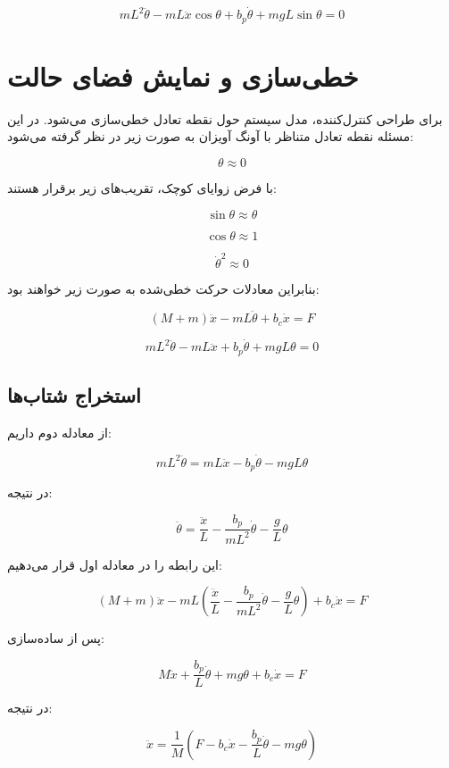\documentclass[a4paper,12pt]{article}
\begin{document}
\[
    mL^2\ddot{\theta}
    -
    mL\ddot{x}\cos\theta
    +
    b_p\dot{\theta}
    +
    mgL\sin\theta
    =
    0
\]

\section{خطی‌سازی و نمایش فضای حالت}

برای طراحی کنترل‌کننده، مدل سیستم حول نقطه تعادل خطی‌سازی می‌شود.
در این مسئله نقطه تعادل متناظر با آونگ آویزان به صورت زیر در نظر گرفته می‌شود:

\[
    \theta \approx 0
\]

با فرض زوایای کوچک، تقریب‌های زیر برقرار هستند:

\[
    \sin\theta \approx \theta
\]

\[
    \cos\theta \approx 1
\]

\[
    \dot{\theta}^2 \approx 0
\]

بنابراین معادلات حرکت خطی‌شده به صورت زیر خواهند بود:

\[
    (M+m)\ddot{x}
    -
    mL\ddot{\theta}
    +
    b_c\dot{x}
    =
    F
\]

\[
    mL^2\ddot{\theta}
    -
    mL\ddot{x}
    +
    b_p\dot{\theta}
    +
    mgL\theta
    =
    0
\]

\subsection{استخراج شتاب‌ها}

از معادله دوم داریم:

\[
    mL^2\ddot{\theta}
    =
    mL\ddot{x}
    -
    b_p\dot{\theta}
    -
    mgL\theta
\]

در نتیجه:

\[
    \ddot{\theta}
    =
    \frac{\ddot{x}}{L}
    -
    \frac{b_p}{mL^2}\dot{\theta}
    -
    \frac{g}{L}\theta
\]

این رابطه را در معادله اول قرار می‌دهیم:

\[
    (M+m)\ddot{x}
    -
    mL
    \left(
    \frac{\ddot{x}}{L}
    -
    \frac{b_p}{mL^2}\dot{\theta}
    -
    \frac{g}{L}\theta
    \right)
    +
    b_c\dot{x}
    =
    F
\]

پس از ساده‌سازی:

\[
    M\ddot{x}
    +
    \frac{b_p}{L}\dot{\theta}
    +
    mg\theta
    +
    b_c\dot{x}
    =
    F
\]

در نتیجه:

\[
    \ddot{x}
    =
    \frac{1}{M}
    \left(
    F
    -
    b_c\dot{x}
    -
    \frac{b_p}{L}\dot{\theta}
    -
    mg\theta
    \right)
\]
\end{document}
